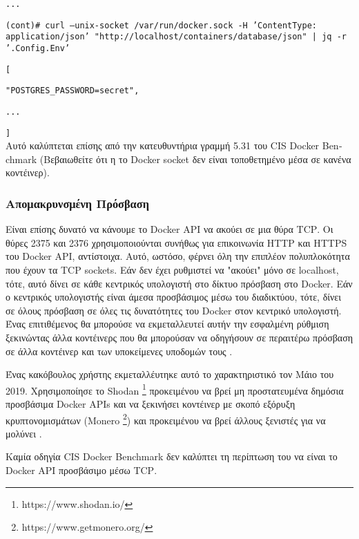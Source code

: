 \texttt{\textlatin{...}}

\texttt{\textlatin{(cont)\# curl --unix-socket /var/run/docker.sock -H 'ContentType: application/json' "http://localhost/containers/database/json" | jq -r '.Config.Env'}}

\texttt{\textlatin{[}}

\texttt{\textlatin{"POSTGRES\_PASSWORD=secret",}}

\texttt{\textlatin{...}}

\texttt{\textlatin{]}}\\

Αυτό καλύπτεται επίσης από την κατευθυντήρια γραμμή 5.31 του
\textlatin{CIS Docker Benchmark} (Βεβαιωθείτε ότι η το \textlatin{Docker socket}
δεν είναι τοποθετημένο μέσα σε κανένα κοντέινερ).

\subsubsection{Απομακρυνσμένη Πρόσβαση}

Είναι επίσης δυνατό να κάνουμε το \textlatin{Docker API} να ακούει σε μια θύρα
\textlatin{TCP}. Οι θύρες 2375 και 2376 χρησιμοποιούνται συνήθως για επικοινωνία
\textlatin{HTTP} και \textlatin{HTTPS} του \textlatin{Docker API}, αντίστοιχα.
Αυτό, ωστόσο, φέρνει όλη την επιπλέον πολυπλοκότητα που έχουν τα
\textlatin{TCP sockets}. Εάν δεν έχει ρυθμιστεί να "ακούει" μόνο σε
\textlatin{localhost}, τότε, αυτό δίνει σε κάθε κεντρικός υπολογιστή στο δίκτυο
πρόσβαση στο \textlatin{Docker}. Εάν ο κεντρικός υπολογιστής είναι άμεσα
προσβάσιμος μέσω του διαδικτύου, τότε, δίνει σε όλους πρόσβαση σε όλες τις
δυνατότητες του \textlatin{Docker} στον κεντρικό υπολογιστή. Ένας επιτιθέμενος
θα μπορούσε να εκμεταλλευτεί αυτήν την εσφαλμένη ρύθμιση ξεκινώντας άλλα
κοντέινερς που θα μπορούσαν να οδηγήσουν σε περαιτέρω πρόσβαση σε άλλα κοντέινερ
και των υποκείμενες υποδομών τους \cite{Metasploit-Unprotected-TCP-Socket}.

Ένας κακόβουλος χρήστης εκμεταλλέυτηκε αυτό το χαρακτηριστικό τον Μάιο του 2019.
Χρησιμοποίησε το \textlatin{Shodan}
\footnote{\textlatin{https://www.shodan.io/}} προκειμένου να βρεί μη
προστατευμένα δημόσια προσβάσιμα \textlatin{Docker APIs} και να ξεκινήσει
κοντέινερ με σκοπό εξόρυξη κρυπτονομισμάτων (\textlatin{Monero}
\footnote{\textlatin{https://www.getmonero.org/}}) και προκειμένου να βρεί
άλλους ξενιστές για να μολύνει \cite{zoolu2-bot-1807} \cite{zoolu2-bot-1809}
\cite{zoolu2-bot-1853}.

Καμία οδηγία \textlatin{CIS Docker Benchmark} δεν καλύπτει τη περίπτωση του
να είναι το \textlatin{Docker API} προσβάσιμο μέσω \textlatin{TCP}.

